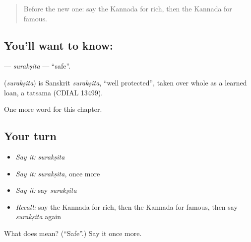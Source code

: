 \label{lesson:KA-C143-suraksita}



\begin{quote}
Before the new one: say the Kannada for rich, then the Kannada for famous.
\end{quote}

\subsection*{You'll want to know: }
\textbf{} — \emph{surakṣita} — \textquotedblleft{}safe\textquotedblright{}.

\begin{cousinweb}
\textbf{} (\emph{surakṣita}) is Sanskrit \emph{surakṣita}, \textquotedblleft{}well protected\textquotedblright{}, taken over whole as a learned loan, a tatsama (CDIAL 13499).
\end{cousinweb}

\begin{grammarlens}[title={What you've built}]
One more word for this chapter.
\end{grammarlens}

\subsection*{Your turn}
\begin{itemize}
\raggedright
  \item \emph{Say it:} \emph{surakṣita}
  \item \emph{Say it:} \emph{surakṣita}, once more
  \item \emph{Say it:} say \emph{surakṣita}
  \item \emph{Recall:} say the Kannada for rich, then the Kannada for famous, then say \emph{surakṣita} again
\end{itemize}

\begin{tcolorbox}[breakable,colback=teal!4,colframe=teal!35!black,title={Before you move on}]
What does  mean? (\textquotedblleft{}Safe\textquotedblright{}.) Say it once more.
\end{tcolorbox}
